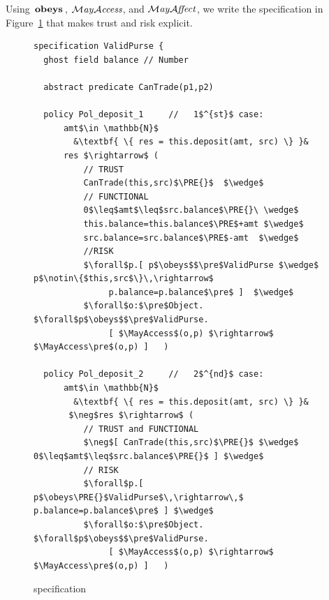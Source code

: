 

Using $\,\textbf{\textrm{obeys}}\,$, $\mathcal{M}\textrm{\textit{ay}}{\mathcal{A}}\textrm{\textit{ccess}}$, and $\mathcal{M}\textrm{\textit{ay}}{\mathcal{A}}\textrm{\textit{ffect}}$, we write the
  specification in Figure~\ref{fig:ValidPurse} that
makes  trust and risk explicit.

\begin{figure}[hbt]
\begin{lstlisting}[escapechar=&]
specification ValidPurse {
  ghost field balance // Number
  
  abstract predicate CanTrade(p1,p2)

  policy Pol_deposit_1     //   1$^{st}$ case:
      amt$\in \mathbb{N}$
        &\textbf{ \{ res = this.deposit(amt, src) \} }&
      res $\rightarrow$ (
          // TRUST
          CanTrade(this,src)$\PRE{}$  $\wedge$
          // FUNCTIONAL  
          0$\leq$amt$\leq$src.balance$\PRE{}\ \wedge$
          this.balance=this.balance$\PRE$+amt $\wedge$
          src.balance=src.balance$\PRE$-amt  $\wedge$
          //RISK
          $\forall$p.[ p$\obeys$$\pre$ValidPurse $\wedge$ p$\notin\{$this,src$\}\,\rightarrow$
               p.balance=p.balance$\pre$ ]  $\wedge$
          $\forall$o:$\pre$Object. $\forall$p$\obeys$$\pre$ValidPurse.
               [ $\MayAccess$(o,p) $\rightarrow$ $\MayAccess\pre$(o,p) ]   )

  policy Pol_deposit_2     //   2$^{nd}$ case:
      amt$\in \mathbb{N}$
        &\textbf{ \{ res = this.deposit(amt, src) \} }&
       $\neg$res $\rightarrow$ (
          // TRUST and FUNCTIONAL  
          $\neg$[ CanTrade(this,src)$\PRE{}$ $\wedge$ 0$\leq$amt$\leq$src.balance$\PRE{}$ ] $\wedge$
          // RISK
          $\forall$p.[ p$\obeys\PRE{}$ValidPurse$\,\rightarrow\,$ p.balance=p.balance$\pre$ ] $\wedge$
          $\forall$o:$\pre$Object. $\forall$p$\obeys$$\pre$ValidPurse.
               [ $\MayAccess$(o,p) $\rightarrow$ $\MayAccess\pre$(o,p) ]   )
\end{lstlisting}
\vspace*{-7mm}
\caption{ specification}
\label{fig:ValidPurse}
\end{figure}
%
\addtocounter{figure}{-1}
%
